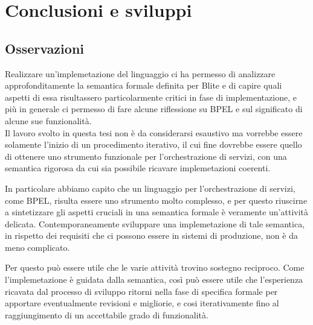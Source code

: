 \chapter{Conclusioni e sviluppi}

\section{Osservazioni}


Realizzare un'implemetazione del linguaggio ci ha permesso di analizzare
approfonditamente la semantica formale definita per Blite e di capire quali
aspetti di essa risultassero particolarmente critici in fase di implementazione,
e più in generale ci permesso di fare alcune riflessione su BPEL e
sul significato di alcune sue funzionalità.
\\

Il lavoro svolto in questa tesi non è da considerarsi esaustivo
ma vorrebbe essere solamente l'inizio di un procedimento iterativo, il cui fine
dovrebbe essere quello di ottenere uno strumento funzionale per
l'orchestrazione di servizi, con una semantica rigorosa da cui sia possibile
ricavare implemetazioni coerenti. 

In particolare abbiamo capito che un linguaggio per l'orchestrazione di servizi,
come BPEL, risulta essere uno strumento molto complesso, e per questo
riuscirne a sintetizzare gli aspetti cruciali in una semantica formale è
veramente un'attività delicata. Contemporaneamente sviluppare una
implemetazione di tale semantica, in rispetto dei requisiti che ci possono
essere in sistemi di produzione, non è da meno complicato. 

Per questo può essere utile che le varie attività trovino sostegno reciproco.
Come l'implemetazione è guidata dalla semantica, così può essere utile che
l'esperienza ricavata dal processo di sviluppo ritorni nella fase di specifica
formale per apportare eventualmente revisioni e migliorie, e cosi
iterativamente fino al raggiungimento di un accettabile grado di funzionalità.
\\

% 

